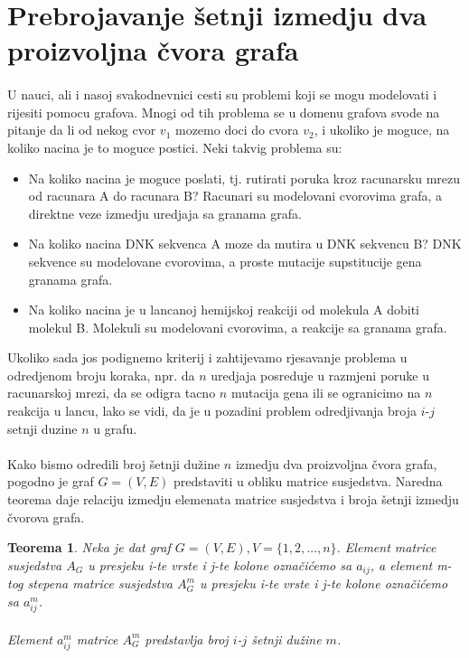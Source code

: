 \documentclass[11pt]{article}
\newtheorem{theorem}{Teorema}
\begin{document}
	\section{Prebrojavanje šetnji izmedju dva proizvoljna čvora grafa}
		\paragraph{}
		U nauci, ali i nasoj svakodnevnici cesti su problemi koji se mogu modelovati i rijesiti pomocu grafova. 
		Mnogi od tih problema se u domenu grafova svode na pitanje da li od nekog cvor $v_1$ mozemo doci do cvora $v_2$, i ukoliko je moguce, na koliko nacina je to moguce postici. Neki takvig problema su:
				\begin{itemize}
				\item Na koliko nacina je moguce poslati, tj. rutirati poruka kroz racunarsku mrezu od racunara A do racunara B? Racunari su modelovani cvorovima grafa, a direktne veze izmedju uredjaja sa granama grafa.
				\item Na koliko nacina DNK sekvenca A moze da mutira u DNK sekvencu B? DNK sekvence su modelovane cvorovima, a proste mutacije supstitucije gena granama grafa. 
				\item Na koliko nacina je u lancanoj hemijskoj reakciji od molekula A dobiti molekul B. Molekuli su modelovani cvorovima, a reakcije sa granama grafa.
				\end{itemize}
	
		Ukoliko sada jos podignemo kriterij i zahtijevamo rjesavanje problema u odredjenom broju koraka, npr. da $n$ uredjaja posreduje u razmjeni poruke u racunarskoj mrezi, 
		da se odigra tacno $n$ mutacija gena ili se 	ogranicimo na $n$ reakcija u lancu, lako se vidi, da je u pozadini problem odredjivanja broja $i$-$j$ setnji duzine $n$ u grafu.
	
		\paragraph{}
		Kako bismo odredili broj šetnji dužine $n$ izmedju dva proizvoljna čvora grafa, pogodno je graf $G = (V, E)$ predstaviti u obliku matrice susjedstva. 
		Naredna teorema daje relaciju izmedju elemenata matrice susjedstva i broja šetnji izmedju čvorova grafa.
	
		\begin{theorem}
		Neka je dat graf $G = (V, E), V = \{1, 2, \dots, n\}$. Element matrice susjedstva $A_G$ u presjeku i-te vrste i j-te kolone označićemo sa $a_{ij}$, 
		a element m-tog stepena matrice susjedstva $A_G^m$ u presjeku i-te vrste i j-te kolone označićemo sa $a_{ij}^m$.
		
		\paragraph{}
		Element $a_{ij}^m$ matrice $A_G^m$ predstavlja broj $i$-$j$ šetnji dužine $m$. 
		\end{theorem}
	
\end{document}
